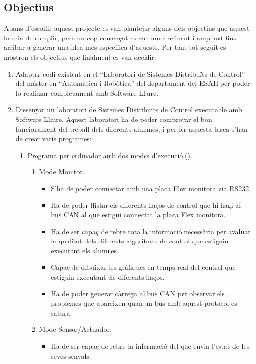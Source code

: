 \subsection{Objectius}%
Abans  d'escollir aquest projecte es van plantejar alguns dels objectius que aquest hauria de complir, però un cop començat es van anar refinant i ampliant fins arribar a generar una idea més específica d'aquests. Per tant tot seguit es mostren els objectius que finalment es van decidir:
\begin{enumerate}
	\item Adaptar codi existent en el “Laboratori de Sistemes Distribuïts de Control” del màster en “Automàtica i Robòtica” del departament del ESAII per poder-lo realitzar completament amb Software Lliure.
	\item Dissenyar un laboratori de Sistemes Distribuïts de Control executable amb Software Lliure. Aquest laboratori ha de poder comprovar el bon funcionament del treball dels diferents alumnes, i per fer aquesta tasca s'han de crear varis programes:
		\begin{enumerate}
			\item Programa per ordinador amb dos modes d'execució (\DCSMonitor).
				\begin{enumerate}
					\item Mode Monitor.
						\begin{itemize}
							\item S'ha de poder connectar amb una placa Flex monitora via RS232.
							\item Ha de poder llistar els diferents llaços de control que hi hagi al bus CAN al que estigui connectat la placa Flex monitora.
							\item Ha de ser capaç de rebre tota la informació necessària per avaluar la qualitat dels diferents algoritmes de control que estiguin executant els alumnes.
							\item Capaç de dibuixar les gràfiques en temps real del control que estiguin executant els diferents llaços.
							\item Ha de poder generar càrrega al bus CAN per observar els problemes que apareixen quan un bus amb aquest protocol es satura.
						\end{itemize}
					\item Mode Sensor/Actuador.
						\begin{itemize}
							\item Ha de ser capaç de rebre la informació del \SensorActuador que envia l'estat de les seves senyals.

\end{itemize}
\end{enumerate}
\end{enumerate}
\end{enumerate}
